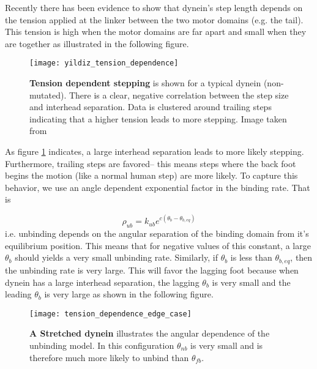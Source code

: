 	Recently there has been evidence to show that dynein's step length depends on the tension applied at the linker between the two motor domains (e.g. the tail).\cite{cleary2014tension} This tension is high when the motor domains are far apart and small when they are together as illustrated in the following figure. \\
	\begin{figure}[!hbt]
		\centering
		\texttt{[image: yildiz\_tension\_dependence]}
		\caption[Tension dependent stepping]{\textbf{Tension dependent stepping} is shown for a typical dynein (non-mutated). There is a clear, negative correlation between the step size and interhead separation. Data is clustered around trailing steps indicating that a higher tension leads to more stepping. Image taken from \cite{cleary2014tension}}
		\label{fig:yildiz_tension}
	\end{figure} 	
	As figure \ref{fig:yildiz_tension} indicates, a large interhead separation leads to more likely stepping. Furthermore, trailing steps are favored-- this means steps where the back foot begins the motion (like a normal human step) are more likely. To capture this behavior, we use an angle dependent exponential factor in the binding rate. That is 
	
	
	
	\begin{equation}
	\rho_{ub} = k_{ub}e^{c(\theta_b-\theta_{b,eq})}
	\end{equation}
	i.e. unbinding depends on the angular separation of the binding domain from it's equilibrium position. This means that for negative values of this constant, a large $\theta_b$ should yields a very small unbinding rate. Similarly, if $\theta_b$ is less than $\theta_{b,eq}$, then the unbinding rate is very large. This will favor the lagging foot because when dynein has a large interhead separation, the lagging $\theta_b$ is very small and the leading $\theta_b$ is very large as shown in the following figure. 
	
	\begin{figure}[!hbt]
		\centering
		\texttt{[image: tension\_dependence\_edge\_case]}
		\caption[Stretched dynein]{\textbf{A Stretched dynein} illustrates the angular dependence of the unbinding model. In this configuration $\theta_{nb}$ is very small and is therefore much more likely to unbind than $\theta_{fb}$.}
	\end{figure}
	
	
	
	
	
	
	
	
	
	
	
	
	
	
	
	
